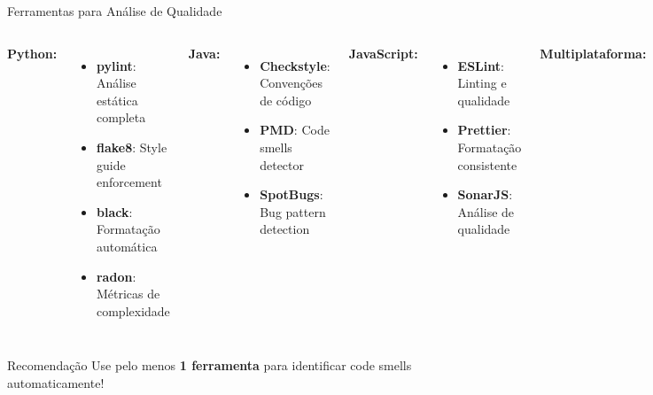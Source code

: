 \documentclass[10pt]{beamer}
\begin{document}
\begin{frame}{Ferramentas para Análise de Qualidade}
\begin{columns}[c]
\textbf{Python:}
\begin{itemize}
    \item \textbf{pylint}: Análise estática completa
    \item \textbf{flake8}: Style guide enforcement
    \item \textbf{black}: Formatação automática
    \item \textbf{radon}: Métricas de complexidade
\end{itemize}

\textbf{Java:}
\begin{itemize}
    \item \textbf{Checkstyle}: Convenções de código
    \item \textbf{PMD}: Code smells detector
    \item \textbf{SpotBugs}: Bug pattern detection
\end{itemize}

\textbf{JavaScript:}
\begin{itemize}
    \item \textbf{ESLint}: Linting e qualidade
    \item \textbf{Prettier}: Formatação consistente
    \item \textbf{SonarJS}: Análise de qualidade
\end{itemize}

\textbf{Multiplataforma:}
\begin{itemize}
    \item \textbf{SonarLint}: Plugin IDE
    \item \textbf{SonarCloud}: Análise online
    \item \textbf{CodeClimate}: Métricas contínuas
\end{itemize}
\end{columns}

\vspace{0.3cm}
\begin{block}{Recomendação}
Use pelo menos \textbf{1 ferramenta} para identificar code smells automaticamente!
\end{block}
\end{frame}
\end{document}
